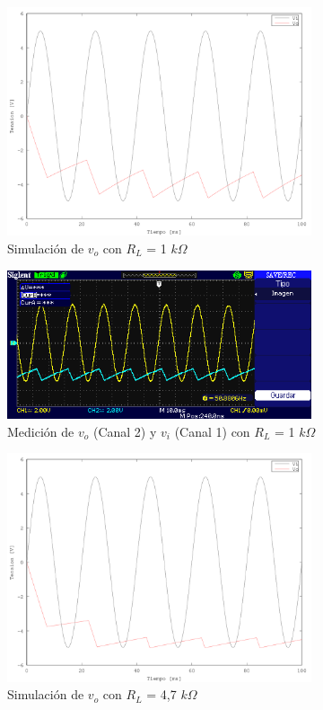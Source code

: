\begin{figure}[H]
  \centering
      \includegraphics[width=0.8\textwidth]{gfxsantiago/FIG_SIM_Rectificador_Precision_4B1.png}
  \caption{Simulación de $v_{o}$ con $R_{L}$ = 1 $k\Omega$}
  \label{fig:sim_4B1}
\end{figure}

\begin{figure}[H]
  \centering
      \includegraphics[width=0.8\textwidth]{gfxsantiago/FIG_MED_Rectificador_Precision_4B1.png}
  \caption{Medición de $v_{o}$ (Canal 2) y $v_{i}$ (Canal 1) con $R_{L}$ = 1 $k\Omega$}
\end{figure}

\begin{figure}[H]
  \centering
      \includegraphics[width=0.8\textwidth]{gfxsantiago/FIG_SIM_Rectificador_Precision_4B2.png}
  \caption{Simulación de $v_{o}$ con $R_{L}$ = 4,7 $k\Omega$}
\end{figure}

